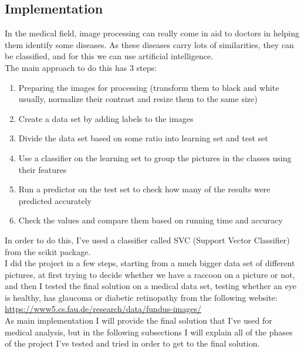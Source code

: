 \documentclass[a4paper,10pt]{article}
\newcommand\tab[1][0.5cm]{\hspace*{#1}}
\begin{document}
  \subsection{Implementation} 
  
  \tab In the medical field, image processing can really come in aid to doctors in helping them identify some diseases. As these diseases carry lots of similarities, they can be classified, and for this we can use artificial intelligence. \\
  \tab The main approach to do this has 3 steps:
  \begin{enumerate}
      \item Preparing the images for processing (transform them to black and white usually, normalize their contrast and resize them to the same size)
      \item Create a data set by adding labels to the images
      \item Divide the data set based on some ratio into learning set and test set
      \item Use a classifier on the learning set to group the pictures in the classes using their features
      \item Run a predictor on the test set to check how many of the results were predicted accurately
      \item Check the values and compare them based on running time and accuracy
  \end{enumerate}
  \tab In order to do this, I've used a classifier called SVC (Support Vector Classifier) from the scikit package. \\
  \tab I did the project in a few steps, starting from a much bigger data set of different pictures, at first trying to decide whether we have a raccoon on a picture or not, and then I tested the final solution on a medical data set, testing whether an eye is healthy, has glaucoma or diabetic retinopathy from the following website: \href{https://www5.cs.fau.de/research/data/fundus-images/}{https://www5.cs.fau.de/research/data/fundus-images/} \\
  \tab As main implementation I will provide the final solution that I've used for medical analysis, but in the following subsections I will explain all of the phases of the project I've tested and tried in order to get to the final solution.
  
\end{document}

